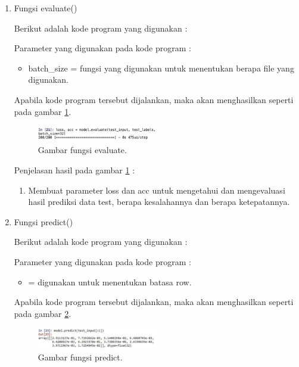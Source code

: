\begin{enumerate}
\item Fungsi evaluate()
	\par Berikut adalah kode program yang digunakan :
	
	\par Parameter yang digunakan pada kode program :
	\begin{itemize}
	\item  batch\_size = fungsi yang digunakan untuk menentukan berapa file yang digunakan.
	\end{itemize}
	
	\par Apabila kode program tersebut dijalankan, maka akan menghasilkan seperti pada gambar \ref{no18}.
	
		\begin{figure}[ht]
		\centerline{\includegraphics[width=0.5\textwidth]{figures/chapter6/no18.jpg}}
		\caption{Gambar fungsi evaluate.}
		\label{no18}
		\end{figure}
		
	\par Penjelasan hasil pada gambar \ref{no18} :
	\begin{enumerate}
	\item Membuat parameter loss dan acc untuk mengetahui dan mengevaluasi hasil prediksi data test, berapa kesalahannya dan berapa ketepatannya.
	\end{enumerate}

\item Fungsi predict()
	\par Berikut adalah kode program yang digunakan :
	
	\par Parameter yang digunakan pada kode program :
	\begin{itemize}
	\item [:1] = digunakan untuk menentukan batasa row.
	\end{itemize}
	
	\par Apabila kode program tersebut dijalankan, maka akan menghasilkan seperti pada gambar \ref{no19}.
	
		\begin{figure}[ht]
		\centerline{\includegraphics[width=0.5\textwidth]{figures/chapter6/no19.jpg}}
		\caption{Gambar fungsi predict.}
		\label{no19}
		\end{figure}
		

\end{enumerate}
